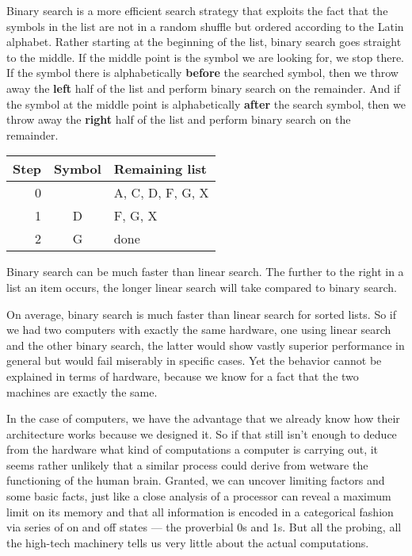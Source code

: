 \begin{examplebox}
    Binary search is a more efficient search strategy that exploits the fact that the symbols in the list are not in a random shuffle but ordered according to the Latin alphabet.
    Rather starting at the beginning of the list, binary search goes straight to the middle.
    If the middle point is the symbol we are looking for, we stop there.
    If the symbol there is alphabetically \textbf{before} the searched symbol, then we throw away the \textbf{left} half of the list and perform binary search on the remainder.
    And if the symbol at the middle point is alphabetically \textbf{after} the search symbol, then we throw away the \textbf{right} half of the list and perform binary search on the remainder.
    \begin{center}
        \begin{tabular}{rcl}
            \toprule
            \textbf{Step} & \textbf{Symbol} & \textbf{Remaining list}\\
            \midrule
            0 &   & A, C, D, F, G, X\\
            1 & D & F, G, X\\
            2 & G & done\\
            \bottomrule
        \end{tabular}
    \end{center}
    Binary search can be much faster than linear search.
    The further to the right in a list an item occurs, the longer linear search will take compared to binary search.
\end{examplebox}
%
On average, binary search is much faster than linear search for sorted lists.
So if we had two computers with exactly the same hardware, one using linear search and the other binary search, the latter would show vastly superior performance in general but would fail miserably in specific cases.
Yet the behavior cannot be explained in terms of hardware, because we know for a fact that the two machines are exactly the same.

In the case of computers, we have the advantage that we already know how their architecture works because we designed it.
So if that still isn't enough to deduce from the hardware what kind of computations a computer is carrying out, it seems rather unlikely that a similar process could derive from wetware the functioning of the human brain.
Granted, we can uncover limiting factors and some basic facts, just like a close analysis of a processor can reveal a maximum limit on its memory and that all information is encoded in a categorical fashion via series of on and off states --- the proverbial 0s and 1s.
But all the probing, all the high-tech machinery tells us very little about the actual computations.

